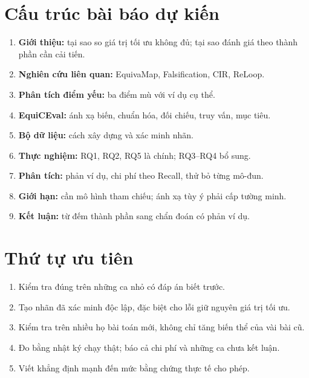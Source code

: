 \documentclass[11pt,a4paper]{article}
\theoremstyle{plain}
\theoremstyle{definition}
\theoremstyle{remark}
\newcommand{\method}{\textsf{EquiCEval}\xspace}
\begin{document}
\section{Cấu trúc bài báo dự kiến}

\begin{enumerate}
  \item \textbf{Giới thiệu:} tại sao so giá trị tối ưu không đủ;
    tại sao đánh giá theo thành phần cần cải tiến.
  \item \textbf{Nghiên cứu liên quan:} EquivaMap, Falsification, CIR, ReLoop.
  \item \textbf{Phân tích điểm yếu:} ba điểm mù với ví dụ cụ thể.
  \item \textbf{\method:} ánh xạ biến, chuẩn hóa, đối chiếu, truy vấn, mục tiêu.
  \item \textbf{Bộ dữ liệu:} cách xây dựng và xác minh nhãn.
  \item \textbf{Thực nghiệm:} RQ1, RQ2, RQ5 là chính; RQ3--RQ4 bổ sung.
  \item \textbf{Phân tích:} phản ví dụ, chi phí theo Recall, thử bỏ từng mô-đun.
  \item \textbf{Giới hạn:} cần mô hình tham chiếu; ánh xạ tùy ý phải cấp tường minh.
  \item \textbf{Kết luận:} từ đếm thành phần sang chẩn đoán có phản ví dụ.
\end{enumerate}

\section{Thứ tự ưu tiên}

\begin{keybox}[unbreakable,title=\textbf{Làm đúng thứ tự này}]
\begin{enumerate}
  \item Kiểm tra đúng trên những ca nhỏ có đáp án biết trước.
  \item Tạo nhãn đã xác minh độc lập, đặc biệt cho lỗi giữ nguyên giá trị tối ưu.
  \item Kiểm tra trên nhiều họ bài toán mới, không chỉ tăng biến thể của vài bài cũ.
  \item Đo bằng nhật ký chạy thật; báo cả chi phí và những ca chưa kết luận.
  \item Viết khẳng định mạnh đến mức bằng chứng thực tế cho phép.
\end{enumerate}
\end{keybox}

\printbibliography[title={Tài liệu tham khảo}]
\end{document}
